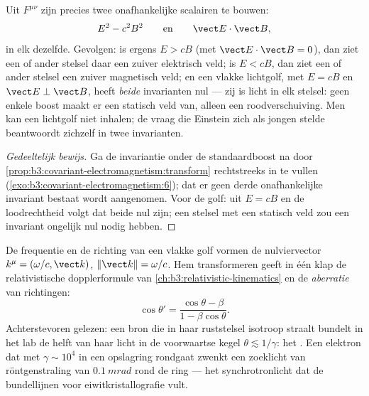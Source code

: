 \begin{proposition}\label{prop:b3:covariant-electromagnetism:invariants}
Uit $F^{\mu\nu}$ zijn precies twee onafhankelijke scalairen te bouwen:
\[
E^2 - c^2B^2
\qquad\text{en}\qquad
\vect E\cdot\vect B ,
\]
in elk  dezelfde. Gevolgen: is ergens $E > cB$ (met
$\vect E\cdot\vect B = 0$), dan ziet een of ander stelsel daar een zuiver
elektrisch veld; is $E < cB$, dan ziet een of ander stelsel een zuiver
magnetisch veld; en een vlakke lichtgolf, met $E = cB$ en $\vect E\perp\vect B$, heeft \emph{beide} invarianten nul --- zij is licht in elk
stelsel: geen enkele boost maakt er een statisch veld van, alleen een
roodverschuiving. Men kan een lichtgolf niet inhalen; de vraag die
Einstein zich als jongen stelde beantwoordt zichzelf in twee invarianten.
\end{proposition}

\begin{proof}[Gedeeltelijk bewijs]
Ga de invariantie onder de standaardboost na door
\cref{prop:b3:covariant-electromagnetism:transform} rechtstreeks in te
vullen (\cref{exo:b3:covariant-electromagnetism:6}); dat er geen derde
onafhankelijke invariant bestaat wordt aangenomen. Voor de golf: uit $E = cB$ en de loodrechtheid volgt dat beide nul zijn; een stelsel met een
statisch veld zou een invariant ongelijk nul nodig hebben.
\end{proof}

\begin{proposition}\label{prop:b3:covariant-electromagnetism:wavevector}
De frequentie en de richting van een vlakke golf vormen de nulviervector
$k^\mu = (\omega/c, \vect k)$, $\|\vect k\| = \omega/c$. Hem
transformeren geeft in één klap de relativistische dopplerformule van
\cref{ch:b3:relativistic-kinematics} en de \emph{aberratie} van
richtingen:
\[
\cos\theta' = \frac{\cos\theta - \beta}{1 - \beta\cos\theta} .
\]
Achterstevoren gelezen: een bron die in haar ruststelsel isotroop straalt
bundelt in het lab de helft van haar licht in de voorwaartse kegel $\theta
\lesssim 1/\gamma$: het \emph{}. Een elektron dat met $\gamma \sim 10^4$ in een opslagring rondgaat zwenkt een zoeklicht van
röntgenstraling van $\qty{0.1}{mrad}$ rond de ring --- het
synchrotronlicht dat de bundellijnen voor eiwitkristallografie vult.
\end{proposition}

